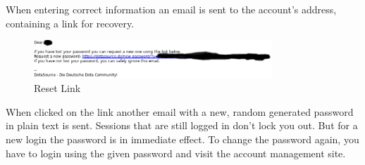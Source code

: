 When entering correct information an email is sent to the account's address, containing a link for recovery.

\begin{figure}[H]
	\centering
	\includegraphics[width=0.8\textwidth]{Assignment0x01/image/email_with_request_link_blacked}
	\caption{Reset Link} \label{img:link_blacked}
\end{figure}

When clicked on the link another email with a new, random generated password in plain text is sent.
Sessions that are still logged in don't lock you out. But for a new login the password is in immediate effect.
To change the password again, you have to login using the given password and visit the account management site.
